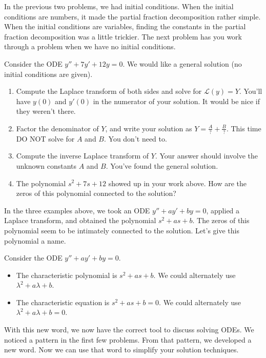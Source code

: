 In the previous two problems, we had initial conditions.  When the initial conditions are numbers, it made the partial fraction decomposition rather simple.  When the initial conditions are variables, finding the constants in the partial fraction decomposition was a little trickier. The next problem has you work through a problem when we have no initial conditions.

\begin{problem}
 Consider the ODE $y''+7y'+12y=0$. We would like a general solution (no initial conditions are given).
 \begin{enumerate}
 \item Compute the Laplace transform of both sides and solve for $\mathscr{L}(y) = Y$. You'll have $y(0)$ and $y'(0)$ in the numerator of your solution. It would be nice if they weren't there.
 \item Factor the denominator of $Y$, and write your solution as $Y = \frac{A}{?}+\frac{B}{?}$. This time DO NOT solve for $A$ and $B$. You don't need to.
 \item Compute the inverse Laplace transform of $Y$.  Your answer should involve the unknown constants $A$ and $B$. You've found the general solution.
 \item The polynomial $s^2+7s+12$ showed up in your work above. How are the zeros of this polynomial connected to the solution?
\end{enumerate}
\end{problem}

In the three examples above, we took an ODE $y''+ay'+by=0$, applied a Laplace transform, and obtained the polynomial $s^2+as+b$.   The zeros of this polynomial seem to be intimately connected to the solution. Let's give this polynomial a name.
\begin{definition}
 Consider the ODE $y''+ay'+by=0$. 
\begin{itemize}
 \item The characteristic polynomial is $s^2+as+b$. We could alternately use $\lambda^2+a\lambda +b$.
 \item The characteristic equation is $s^2+as+b=0$. We could alternately use $\lambda^2+a\lambda +b=0$.
\end{itemize}
\end{definition}
With this new word, we now have the correct tool to discuss solving ODEs. We noticed a pattern in the first few problems.  From that pattern, we developed a new word.  Now we can use that word to simplify your solution techniques.


